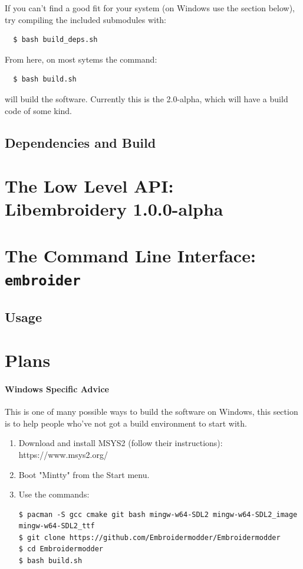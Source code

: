\documentclass[a4paper, 11pt]{report}
\newcommand{\libembversion}{1.0.0-alpha}
\begin{document}
If you can't find a good fit for your system (on Windows use the section below),
try compiling the included submodules with:

\begin{verbatim}
  $ bash build_deps.sh
\end{verbatim}

From here, on most sytems the command:

\begin{verbatim}
  $ bash build.sh
\end{verbatim}

will build the software. Currently this is the 2.0-alpha, which will have a build code of
some kind.

\section{Dependencies and Build}

\chapter{The Low Level API: Libembroidery \libembversion}

\chapter{The Command Line Interface: \texttt{embroider}}

\section{Usage}

\chapter{Plans}

\subsubsection{Windows Specific Advice}

This is one of many possible ways to build the software on Windows,
this section is to help people who've not got a build environment to start with.

\begin{enumerate}
\item Download and install MSYS2 (follow their instructions): https://www.msys2.org/
\item Boot "Mintty" from the Start menu.
\item Use the commands:

\begin{verbatim}
$ pacman -S gcc cmake git bash mingw-w64-SDL2 mingw-w64-SDL2_image mingw-w64-SDL2_ttf
$ git clone https://github.com/Embroidermodder/Embroidermodder
$ cd Embroidermodder
$ bash build.sh
\end{verbatim}
\end{enumerate}
\end{document}
